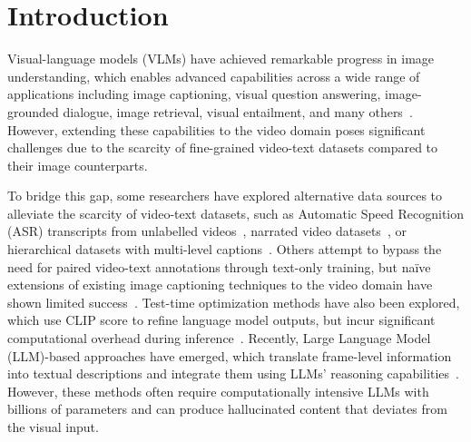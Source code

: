 
\section{Introduction}
\label{sec:intro}

Visual-language models (VLMs) have achieved remarkable progress in image understanding, which enables advanced capabilities across a wide range of applications including image captioning, visual question answering, image-grounded dialogue, image retrieval, visual entailment, and many others~\cite{alayrac2022flamingo, instructblip, gpt4v, liu2024llavanext, chen2024far}. 
However, extending these capabilities to the video domain poses significant challenges due to the scarcity of fine-grained video-text datasets compared to their image counterparts.

To bridge this gap, some researchers have explored alternative data sources to alleviate the scarcity of video-text datasets, such as Automatic Speed Recognition (ASR) transcripts from unlabelled videos~\cite{seo2022end}, narrated video datasets~\cite{huang2020multimodal, yang2023vid2seq}, or hierarchical datasets with multi-level captions~\cite{zala2023hierarchical}.
Others attempt to bypass the need for paired video-text annotations through text-only training, but na\"ive extensions of existing image captioning techniques to the video domain have shown limited success~\cite{lidecap, zhang2024connect}.
Test-time optimization methods have also been explored, which use CLIP score to refine language model outputs, but incur significant computational overhead during inference~\cite{su2022language, Tewel_2023_BMVC}.
Recently, Large Language Model (LLM)-based approaches have emerged, which translate frame-level information into textual descriptions and integrate them using LLMs' reasoning capabilities~\cite{wang2022language, chen2023video}. 
However, these methods often require computationally intensive LLMs with billions of parameters and can produce hallucinated content that deviates from the visual input.

